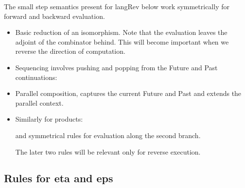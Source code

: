 \documentclass[preprint]{sigplanconf}
\begin{document}
The small step semantics present for {{langRev}} below work
symmetrically for forward and backward evaluation.

\begin{itemize}
\item 
Basic reduction of an isomorphism. Note that the evaluation leaves the
adjoint of the combinator behind. This will become important when we
reverse the direction of computation.


\item
Sequencing involves pushing and popping from the Future and Past
continuations:


\item
Parallel composition, captures the current Future and Past and extends
the parallel context.


\item
Similarly for products:


and symmetrical rules for evaluation along the second branch. 

The later two rules will be relevant only for reverse execution. 

\end{itemize}


\subsection{Rules for {{eta}} and {{eps}} }
\end{document}
